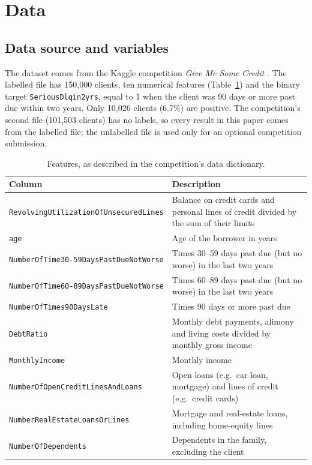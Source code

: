 \section{Data}
\label{sec:data}

\subsection{Data source and variables}
\label{sec:data-source}
The dataset comes from the Kaggle competition \emph{Give Me Some Credit}
\citep{kaggle2011givemesomecredit}. The labelled file has 150{,}000 clients,
ten numerical features (Table~\ref{tab:variables}) and the binary target
\texttt{SeriousDlqin2yrs}, equal to 1 when the client was 90 days or more past
due within two years. Only 10{,}026 clients (6.7\%) are positive. The
competition's second file (101{,}503 clients) has no labels, so every result in
this paper comes from the labelled file; the unlabelled file is used only for
an optional competition submission.

\begin{table}[ht]
  \centering
  \footnotesize
  \caption{Features, as described in the competition's data dictionary.}
  \label{tab:variables}
  \begin{tabular}{@{}lp{8.6cm}@{}}
    \toprule
    Column & Description \\
    \midrule
    \texttt{RevolvingUtilizationOfUnsecuredLines} & Balance on credit cards and personal lines of credit divided by the sum of their limits \\
    \texttt{age} & Age of the borrower in years \\
    \texttt{NumberOfTime30-59DaysPastDueNotWorse} & Times 30--59 days past due (but no worse) in the last two years \\
    \texttt{NumberOfTime60-89DaysPastDueNotWorse} & Times 60--89 days past due (but no worse) in the last two years \\
    \texttt{NumberOfTimes90DaysLate} & Times 90 days or more past due \\
    \texttt{DebtRatio} & Monthly debt payments, alimony and living costs divided by monthly gross income \\
    \texttt{MonthlyIncome} & Monthly income \\
    \texttt{NumberOfOpenCreditLinesAndLoans} & Open loans (e.g.\ car loan, mortgage) and lines of credit (e.g.\ credit cards) \\
    \texttt{NumberRealEstateLoansOrLines} & Mortgage and real-estate loans, including home-equity lines \\
    \texttt{NumberOfDependents} & Dependents in the family, excluding the client \\
    \bottomrule
  \end{tabular}
\end{table}

